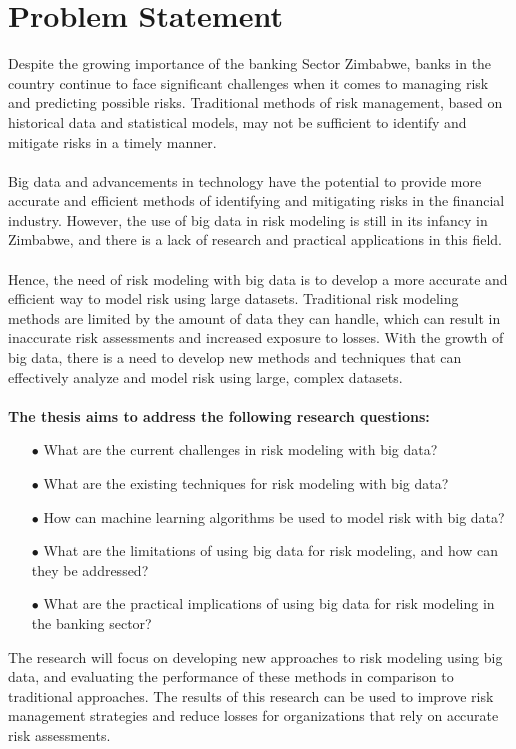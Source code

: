 \section{Problem Statement}

Despite the growing importance of the banking Sector Zimbabwe, banks in the country continue
to face significant challenges when it comes to managing risk and predicting possible risks.
Traditional methods of risk management, based on historical data and statistical models, may not
be sufficient to identify and mitigate risks in a timely manner.\\\\
Big data and advancements in technology have the potential to provide more accurate and
efficient methods of identifying and mitigating risks in the financial industry. However, the use
of big data in risk modeling is still in its infancy in Zimbabwe, and there is a lack of research and
practical applications in this field.\\\\
Hence, the need of risk modeling with big data is to develop a more accurate and efficient way to
model risk using large datasets. Traditional risk modeling methods are limited by the amount of
data they can handle, which can result in inaccurate risk assessments and increased exposure to
losses. With the growth of big data, there is a need to develop new methods and techniques that
can effectively analyze and model risk using large, complex datasets.\\\\
\textbf{The thesis aims to address the following research questions:}
\begin{itemize}
    \item[$\bullet$] What are the current challenges in risk modeling with big data?
    \item[$\bullet$] What are the existing techniques for risk modeling with big data?
    \item[$\bullet$] How can machine learning algorithms be used to model risk with big data?
    \item[$\bullet$]What are the limitations of using big data for risk modeling, and how can they be addressed?
    \item[$\bullet$] What are the practical implications of using big data for risk modeling in the banking sector?\\
\end{itemize}
The research will focus on developing new approaches to risk modeling using big data, and
evaluating the performance of these methods in comparison to traditional approaches. The results
of this research can be used to improve risk management strategies and reduce losses for
organizations that rely on accurate risk assessments.

